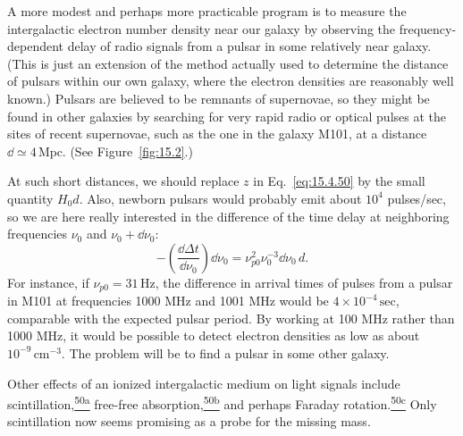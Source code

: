 A more modest and perhaps more practicable program is to measure the
intergalactic electron number density near our galaxy by observing the
frequency-dependent delay of radio signals from a pulsar in some relatively
near galaxy. (This is just an extension of the method actually used to
determine the distance of pulsars within our own galaxy, where the electron
densities are reasonably well known.) Pulsars are believed to be remnants of
supernovae, so they might be found in other galaxies by searching for very
rapid radio or optical pulses at the sites of recent supernovae, such as the
one in the galaxy M101, at a distance \(\dd\simeq4\,\mathrm{Mpc}\). (See
Figure~\ref{fig:15.2}.)



At such short distances, we should replace \(z\) in Eq.~\eqref{eq:15.4.50}
by the small quantity \(H_0d\). Also, newborn pulsars would probably emit
about \(10^4\) pulses/sec, so we are here really interested in the difference
of the time delay at neighboring frequencies \(\nu_0\) and
\(\nu_0+\dd\nu_0\):
\[
  -\left(\frac{\dd\Delta t}{\dd\nu_0}\right)\dd\nu_0
  =
  \nu_{p0}^2\nu_0^{-3}\dd\nu_0\,d.
\]
For instance, if \(\nu_{p0}=31\,\mathrm{Hz}\), the difference in arrival
times of pulses from a pulsar in M101 at frequencies 1000 MHz and 1001 MHz
would be \(4\times10^{-4}\,\mathrm{sec}\), comparable with the expected
pulsar period. By working at 100 MHz rather than 1000 MHz, it would be
possible to detect electron densities as low as about
\(10^{-9}\,\mathrm{cm^{-3}}\). The problem will be to find a pulsar in some
other galaxy.

Other effects of an ionized intergalactic medium on light signals include
scintillation,\hyperref[ch15-ref-50a]{\textsuperscript{50a}} free-free
absorption,\hyperref[ch15-ref-50b]{\textsuperscript{50b}} and perhaps Faraday
rotation.\hyperref[ch15-ref-50c]{\textsuperscript{50c}} Only scintillation
now seems promising as a probe for the missing mass.
